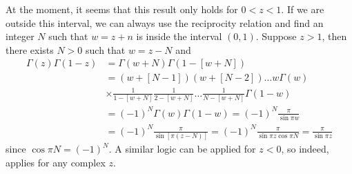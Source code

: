 At the moment, it seems that this result only holds for $0 < z < 1$.
If we are outside this interval, we can always use the reciprocity relation and find an integer $N$ such that $w = z + n$ is inside the interval $(0,1)$.
Suppose $z > 1$, then there exists $N > 0$ such that $w = z - N$ and
\begin{align}
    \Gamma(z)\Gamma(1-z) &= \Gamma(w + N) \Gamma(1 - [w + N]) \nonumber \\
                         &= (w + [N-1])(w + [N-2])\ldots w \Gamma(w) \nonumber \\
                         &\times \frac{1}{1 - [w + N]} \frac{1}{2 - [w + N]} \ldots \frac{1}{N - [w + N]} \Gamma(1 - w) \nonumber \\
                         &= (-1)^{N} \Gamma(w) \Gamma(1 - w) = (-1)^{N} \frac{\pi}{\sin{\pi w}} \nonumber \\
                         &= (-1)^{N} \frac{\pi}{\sin[\pi(z - N)]} = (-1)^{N} \frac{\pi}{\sin{\pi z} \cos{\pi N}} = \frac{\pi}{\sin{\pi z}}
\end{align}
since $\cos{\pi N} = (-1)^{N}$.
A similar logic can be applied for $z < 0$, so indeed,  applies for any complex $z$.





